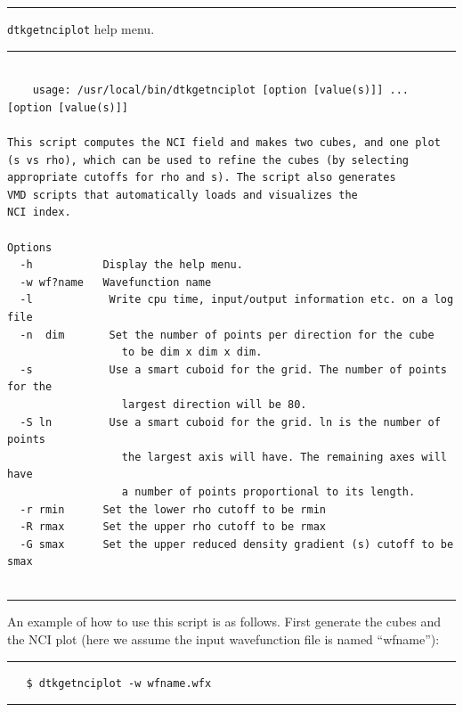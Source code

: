 \rule{\textwidth}{1pt}
{\center\texttt{dtkgetnciplot} help menu.\\}
\rule{\textwidth}{1pt}
\begin{footnotesize}
\begin{verbatim}

    usage: /usr/local/bin/dtkgetnciplot [option [value(s)]] ... [option [value(s)]]

This script computes the NCI field and makes two cubes, and one plot
(s vs rho), which can be used to refine the cubes (by selecting
appropriate cutoffs for rho and s). The script also generates
VMD scripts that automatically loads and visualizes the 
NCI index.

Options 
  -h           Display the help menu.
  -w wf?name   Wavefunction name
  -l        	Write cpu time, input/output information etc. on a log file
  -n  dim   	Set the number of points per direction for the cube
            	  to be dim x dim x dim.
  -s        	Use a smart cuboid for the grid. The number of points for the
            	  largest direction will be 80.
  -S ln     	Use a smart cuboid for the grid. ln is the number of points
            	  the largest axis will have. The remaining axes will have
            	  a number of points proportional to its length.
  -r rmin      Set the lower rho cutoff to be rmin
  -R rmax      Set the upper rho cutoff to be rmax
  -G smax      Set the upper reduced density gradient (s) cutoff to be smax


\end{verbatim}
\end{footnotesize}
\rule{\textwidth}{1pt}

An example of how to use this script is as follows. First generate the cubes and the NCI plot
(here we assume the input wavefunction file is named ``wfname''):

\rule{\textwidth}{1pt}
\begin{footnotesize}
\begin{verbatim}
   $ dtkgetnciplot -w wfname.wfx
\end{verbatim}
\end{footnotesize}
\rule{\textwidth}{1pt}

